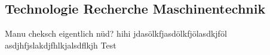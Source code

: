 \documentclass[../main.tex]{subfiles}
\begin{document}
\subsection{Technologie Recherche Maschinentechnik}
Manu cheksch eigentlich nüd?
hihi
jdasölkfjasdölkfjölasdkjföl
asdjhfjslakdjfhlkjalsdflkjh
Test
\end{document}
